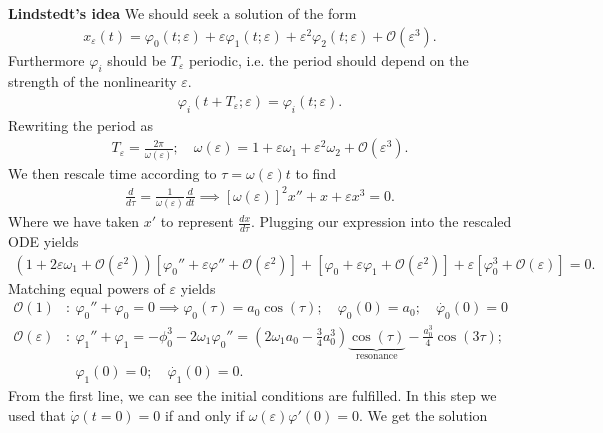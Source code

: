 \begin{ex}
\noindent
\textbf{Lindstedt's idea} We should seek a solution of the form
\begin{align}
	x_{\varepsilon}(t) = \varphi_0(t;\varepsilon) + \varepsilon \varphi_1 (t;\varepsilon) + \varepsilon^2 \varphi_2(t;\varepsilon) + \mathcal{O}(\varepsilon^3).
\end{align}
Furthermore $\varphi_i$ should be $T_\varepsilon$ periodic, i.e. the period should depend on the strength of the  nonlinearity $\varepsilon$.
\begin{align}
	\varphi_i(t+T_\varepsilon; \varepsilon) = \varphi_i(t;\varepsilon).
\end{align}
Rewriting the period as
\begin{align}
	T_\varepsilon = \frac{2 \pi }{\omega(\varepsilon)}; \quad \omega(\varepsilon) = 1 + \varepsilon \omega_1 + \varepsilon^2 \omega_2 + \mathcal{O}(\varepsilon^3).
\end{align}
We then rescale time according to $\tau = \omega(\varepsilon) t$ to find
\begin{align}
	\frac{d}{d\tau} = \frac{1}{\omega(\varepsilon)} \frac{d}{dt} \implies 
	\boxed{[\omega(\varepsilon)]^2 x'' + x + \varepsilon x^3 = 0.}
\end{align}
Where we have taken $x'$ to represent $\frac{dx}{d\tau}$. Plugging our expression into the rescaled ODE yields
\begin{align}
	\left( 1 + 2 \varepsilon \omega_1 + \mathcal{O}(\varepsilon^2) \right) \left[ \varphi_0'' + \varepsilon \varphi'' + \mathcal{O}(\varepsilon^2) \right] + \left[ \varphi_0 + \varepsilon \varphi_1 + \mathcal{O}(\varepsilon^2) \right] + \varepsilon \left[\varphi_0^{3} + \mathcal{O}(\varepsilon) \right] = 0.
\end{align}
Matching equal powers of $\varepsilon$ yields
\begin{align}
	\mathcal{O}(1)&:\ \varphi_0'' + \varphi_0 = 0 \implies \varphi_0(\tau) = a_0 \cos(\tau);\quad \varphi_0(0)=a_0;\quad \dot{\varphi_0}(0) = 0 \\
	\mathcal{O}(\varepsilon)&:\ \varphi_1'' + \varphi_1 = - \phi_0^{3} - 2\omega_1 \varphi_{0}'' = 
	\left(2 \omega_1 a_0 - \frac{3}{4}a_0^{3}\right) \underbrace{\cos (\tau)}_{ \textrm{resonance} } - \frac{a_0^{3}}{4} \cos(3 \tau); \\
			     &\phantom{:}\ \varphi_1(0)=0; \quad \dot{\varphi_1}(0) = 0. 
\end{align}
From the first line, we can see the initial conditions are fulfilled. In this step we used that $\dot{\varphi}(t=0) = 0$ if and only if $\omega(\varepsilon)\varphi '(0) = 0$. We get the solution

\end{ex}
